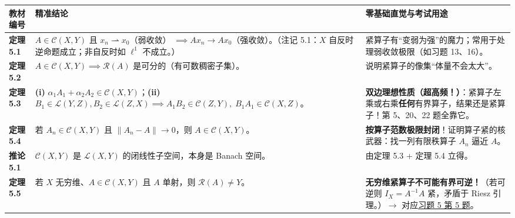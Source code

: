 \documentclass[11pt,a4paper]{article}
\newcounter{none}
\begin{document}
{\def\LTcaptype{none} %
{\small\renewcommand{\arraystretch}{1.38}\setlength{\tabcolsep}{5pt}
\begin{longtable}[]{@{}
  >{\raggedright\arraybackslash}p{}
  >{\raggedright\arraybackslash}p{}
  >{\raggedright\arraybackslash}p{}@{}}
\toprule\noalign{}
\rowcolor{AccentSoft}
\begin{minipage}[b]{\linewidth}\raggedright
教材编号
\end{minipage} & \begin{minipage}[b]{\linewidth}\raggedright
精准结论
\end{minipage} & \begin{minipage}[b]{\linewidth}\raggedright
零基础直觉与考试用途
\end{minipage} \\
\midrule\noalign{}
\endhead
\bottomrule\noalign{}
\endlastfoot
\textbf{定理 5.1} & \(A \in \mathcal{C}(X, Y)\) 且 \(x_n \rightharpoonup x_0\)（弱收敛） \(\implies Ax_n \to Ax_0\)（强收敛）。（注记 5.1：\(X\) 自反时逆命题成立；非自反时如 \(\ell^1\) 不成立。） & 紧算子有``变弱为强''的魔力；常用于处理弱收敛极限（如习题 13、16）。 \\
\textbf{定理 5.2} & \(A \in \mathcal{C}(X, Y) \implies \mathcal{R}(A)\) 是可分的（有可数稠密子集）。 & 说明紧算子的像集``体量不会太大''。 \\
\textbf{定理 5.3} & \textbf{(i)} \(\alpha_1 A_1 + \alpha_2 A_2 \in \mathcal{C}(X, Y)\)；\textbf{(ii)} \(B_1 \in \mathcal{L}(Y, Z), B_2 \in \mathcal{L}(Z, X) \implies A_1 B_2 \in \mathcal{C}(Z, Y), \; B_1 A_1 \in \mathcal{C}(X, Z)\)。 & \textbf{双边理想性质（超高频！）}：紧算子左乘或右乘\textbf{任何}有界算子，结果还是紧算子！第 5、20、22 题全靠它。 \\
\textbf{定理 5.4} & 若 \(A_n \in \mathcal{C}(X, Y)\) 且 \(\lVert A_n - A\rVert \to 0\)，则 \(A \in \mathcal{C}(X, Y)\)。 & \textbf{按算子范数极限封闭}！证明算子紧的核武器：找一列有限秩算子 \(A_n\) 逼近 \(A\)。 \\
\textbf{推论 5.1} & \(\mathcal{C}(X, Y)\) 是 \(\mathcal{L}(X, Y)\) 的闭线性子空间，本身是 Banach 空间。 & 由定理 5.3 + 定理 5.4 立得。 \\
\textbf{定理 5.5} & 若 \(X\) 无穷维、\(A \in \mathcal{C}(X, Y)\) 且 \(A\) 单射，则 \(\mathcal{R}(A) \neq Y\)。 & \textbf{无穷维紧算子不可能有界可逆！}（若可逆则 \(I_X = A^{-1}A\) 紧，矛盾于 Riesz 引理。）\(\to\) 对应\hyperlink{prob:5-5}{\textcolor{LinkColor}{习题 5 第 5 题}}。 \\

\end{longtable}}}
\end{document}
